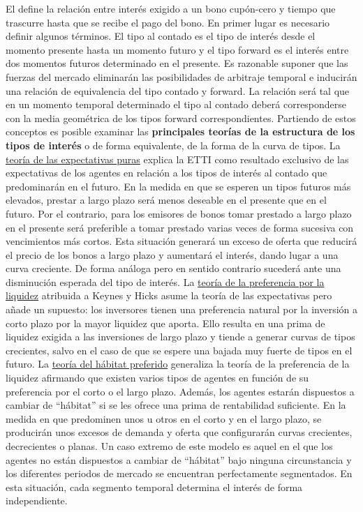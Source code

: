 \documentclass{nuevotema}
\begin{document}
El  define la relación entre interés exigido a un bono cupón-cero y tiempo que trascurre hasta que se recibe el pago del bono. En primer lugar es necesario definir algunos términos. El tipo al contado es el tipo de interés desde el momento presente hasta un momento futuro y el tipo forward es el interés entre dos momentos futuros determinado en el presente. Es razonable suponer que las fuerzas del mercado eliminarán las posibilidades de arbitraje temporal e inducirán una relación de equivalencia del tipo contado y forward. La relación será tal que en un momento temporal determinado el tipo al contado deberá corresponderse con la media geométrica de los tipos forward correspondientes. Partiendo de estos conceptos es posible examinar las \textbf{principales teorías de la estructura de los tipos de interés} o de forma equivalente, de la forma de la curva de tipos. La \underline{teoría de las expectativas puras} explica la ETTI como resultado exclusivo de las expectativas de los agentes en relación a los tipos de interés al contado que predominarán en el futuro. En la medida en que se esperen un tipos futuros más elevados, prestar a largo plazo será menos deseable en el presente que en el futuro. Por el contrario, para los emisores de bonos tomar prestado a largo plazo en el presente será preferible a tomar prestado varias veces de forma sucesiva con vencimientos más cortos. Esta situación generará un exceso de oferta que reducirá el precio de los bonos a largo plazo y aumentará el interés, dando lugar a una curva creciente. De forma análoga pero en sentido contrario sucederá ante una disminución esperada del tipo de interés. La \underline{teoría de la preferencia por la liquidez} atribuida a Keynes y Hicks asume la teoría de las expectativas pero añade un supuesto: los inversores tienen una preferencia natural por la inversión a corto plazo por la mayor liquidez que aporta. Ello resulta en una prima de liquidez exigida a las inversiones de largo plazo y tiende a generar curvas de tipos crecientes, salvo en el caso de que se espere una bajada muy fuerte de tipos en el futuro. La \underline{teoría del hábitat preferido} generaliza la teoría de la preferencia de la liquidez afirmando que existen varios tipos de agentes en función de su preferencia por el corto o el largo plazo. Además, los agentes estarán dispuestos a cambiar de ``hábitat'' si se les ofrece una prima de rentabilidad suficiente. En la medida en que predominen unos u otros en el corto y en el largo plazo, se producirán unos excesos de demanda y oferta que configurarán curvas crecientes, decrecientes o planas. Un caso extremo de este modelo es aquel en el que los agentes no están dispuestos a cambiar de ``hábitat'' bajo ninguna circunstancia y los diferentes periodos de mercado se encuentran perfectamente segmentados. En esta situación, cada segmento temporal determina el interés de forma independiente.
\end{document}
